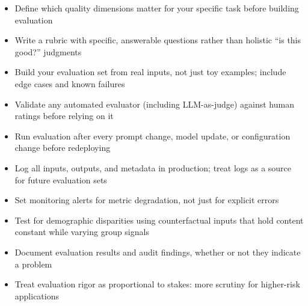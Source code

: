 \begin{itemize}[noitemsep,topsep=0pt]
  \item Define which quality dimensions matter for your specific task before building evaluation
  \item Write a rubric with specific, answerable questions rather than holistic ``is this good?'' judgments
  \item Build your evaluation set from real inputs, not just toy examples; include edge cases and known failures
  \item Validate any automated evaluator (including LLM-as-judge) against human ratings before relying on it
  \item Run evaluation after every prompt change, model update, or configuration change before redeploying
  \item Log all inputs, outputs, and metadata in production; treat logs as a source for future evaluation sets
  \item Set monitoring alerts for metric degradation, not just for explicit errors
  \item Test for demographic disparities using counterfactual inputs that hold content constant while varying group signals
  \item Document evaluation results and audit findings, whether or not they indicate a problem
  \item Treat evaluation rigor as proportional to stakes: more scrutiny for higher-risk applications
\end{itemize}
